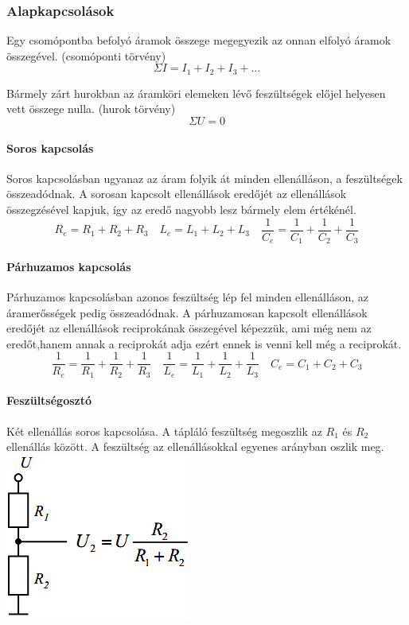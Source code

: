\subsubsection{Alapkapcsolások}
\begin{theorem}
	Egy csomópontba befolyó áramok összege megegyezik az onnan elfolyó áramok összegével. (csomóponti törvény) $$ \Sigma I = I_1 + I_2 + I_3 + \dots$$
\end{theorem}

\begin{theorem}
	Bármely zárt hurokban az áramköri elemeken lévő feszültségek előjel helyesen vett összege nulla. (hurok törvény) $$ \Sigma U = 0 $$
\end{theorem}

\paragraph{Soros kapcsolás}
Soros kapcsolásban ugyanaz az áram folyik át minden ellenálláson, a feszültségek
összeadódnak. A sorosan kapcsolt ellenállások eredőjét az ellenállások összegzésével kapjuk, így az eredő nagyobb lesz bármely elem értékénél.
$$R_e = R_1 + R_2 + R_3\quad 
L_e = L_1 + L_2 + L_3\quad 
\frac{1}{C_e} = \frac{1}{C_1} + \frac{1}{C_2} + \frac{1}{C_3}$$

\paragraph{Párhuzamos kapcsolás}
Párhuzamos kapcsolásban azonos feszültség lép fel minden ellenálláson, az áramerősségek pedig összeadódnak. A párhuzamosan kapcsolt ellenállások eredőjét az ellenállások reciprokának összegével képezzük, ami még nem az eredőt,hanem annak a reciprokát adja ezért ennek is venni kell még a reciprokát.
$$\frac{1}{R_e} = \frac{1}{R_1} + \frac{1}{R_2} + \frac{1}{R_3}\quad \frac{1}{L_e} = \frac{1}{L_1} + \frac{1}{L_2} + \frac{1}{L_3}\quad 
C_e = C_1 + C_2 + C_3$$

\paragraph{Feszültségosztó}
Két ellenállás soros kapcsolása. A tápláló feszültség megoszlik az $R_1$ és $R_2$ ellenállás között. A feszültség az ellenállásokkal egyenes arányban oszlik meg.\\ %
\includegraphics[width=0.25\linewidth]{fig/10-voltage_divider}

